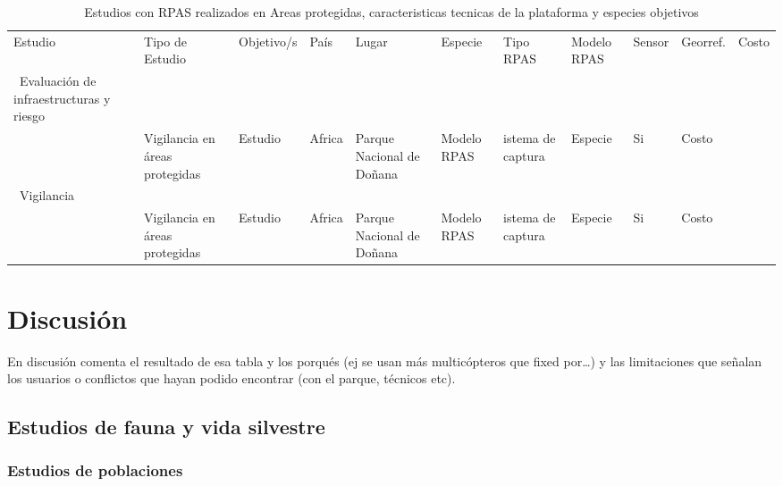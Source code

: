 \documentclass[11pt,]{article}
\begin{document}
\begin{sidewaystable}
\centering
\captionsetup{font=scriptsize,labelfont=scriptsize}
\caption{Estudios con RPAS realizados en Areas protegidas, caracteristicas tecnicas de la plataforma y especies objetivos}
\label{my-label}
\tiny
\begin{tabular}{p{2.5cm}p{1cm}p{3cm}p{1cm}p{2cm}p{2cm}p{1cm}p{2cm}p{2cm}p{1cm}p{0.5cm}}
\cmidrule(r){1-11}

Estudio & Tipo de Estudio & Objetivo/s & País & Lugar & Especie & Tipo RPAS & Modelo RPAS & Sensor & Georref. & Costo \\ \cmidrule(r){1-11}

\ Evaluación de infraestructuras y riesgo\\

\cite{Mulero-Pazmany2014}  & Vigilancia en áreas protegidas & Estudio & Africa & Parque Nacional de Doñana & Modelo RPAS  & istema de captura & Especie & Si & Costo  \\ 

\ Vigilancia \\ 

\cite{Mulero-Pazmany2014}  & Vigilancia en áreas protegidas & Estudio & Africa & Parque Nacional de Doñana & Modelo RPAS  & istema de captura & Especie & Si & Costo  \\ 


\end{tabular}
\end{sidewaystable}

\section{Discusión}\label{discusion}

En discusión comenta el resultado de esa tabla y los porqués (ej se usan
más multicópteros que fixed por\ldots{}) y las limitaciones que señalan
los usuarios o conflictos que hayan podido encontrar (con el parque,
técnicos etc).

\subsection{Estudios de fauna y vida
silvestre}\label{estudios-de-fauna-y-vida-silvestre}

\subsubsection{Estudios de poblaciones}\label{estudios-de-poblaciones}
\end{document}
